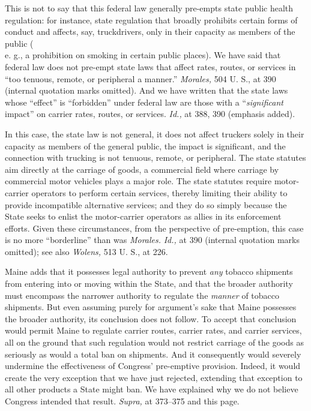 {{  This is not to say that this federal law generally pre-empts state
public health regulation: for instance, state regulation that broadly
prohibits certain forms of conduct and affects, say, truckdrivers, only
in their capacity as members of the public (\\e. g.,} a prohibition on
smoking in certain public places). We have said that federal law does
not pre-empt state laws that affect rates, routes, or services in ``too
tenuous, remote, or peripheral a manner.'' \emph{Morales,} 504 U. S., at
390 (internal quotation marks omitted). And we have written that the
state laws whose ``effect'' is ``forbidden'' under federal law are
those with a ``\emph{significant} impact'' on carrier rates, routes, or
services. \emph{Id.,} at 388, 390 (emphasis added).

  In this case, the state law is not general, it does not affect
truckers solely in their capacity as members of the general public, the
impact is significant, and the connection with trucking is not tenuous,
remote, or peripheral. The state \newpage  statutes aim directly at the
carriage of goods, a commercial field where carriage by commercial motor
vehicles plays a major role. The state statutes require motor-carrier
operators to perform certain services, thereby limiting their ability
to provide incompatible alternative services; and they do so simply
because the State seeks to enlist the motor-carrier operators as
allies in its enforcement efforts. Given these circumstances, from the
perspective of pre-emption, this case is no more ``borderline'' than
was \emph{Morales.} \emph{Id.,} at 390 (internal quotation marks omitted);
see also \emph{Wolens,} 513 U. S., at 226.

  Maine adds that it possesses legal authority to prevent \emph{any}
tobacco shipments from entering into or moving within the State, and
that the broader authority must encompass the narrower authority to
regulate the \emph{manner} of tobacco shipments. But even assuming purely
for argument's sake that Maine possesses the broader authority, its
conclusion does not follow. To accept that conclusion would permit Maine
to regulate carrier routes, carrier rates, and carrier services, all on
the ground that such regulation would not restrict carriage of the goods
as seriously as would a total ban on shipments. And it consequently
would severely undermine the effectiveness of Congress' pre-emptive
provision. Indeed, it would create the very exception that we have just
rejected, extending that exception to all other products a State might
ban. We have explained why we do not believe Congress intended that
result. \emph{Supra,} at 373--375 and this page.

}
